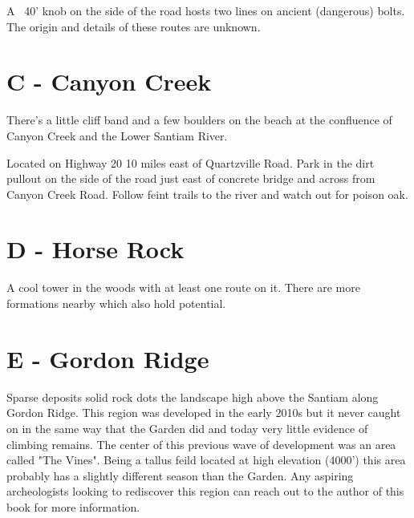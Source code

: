 \begin{multicols}{2}
A ~40' knob on the side of the road hosts two lines on ancient (dangerous) bolts. The origin and details of these routes are unknown.\\




\needspace{6em}

\section{C - Canyon Creek}\label{sa:Canyon Creek}

There's a little cliff band and a few boulders on the beach at the confluence of Canyon Creek and the Lower Santiam River.

Located on Highway 20 10 miles east of Quartzville Road. Park in the dirt pullout on the side of the road just east of concrete bridge and across from Canyon Creek Road. Follow feint trails to the river and watch out for poison oak.\\




\needspace{6em}

\section{D - Horse Rock}\label{sa:Horse Rock}

A cool tower in the woods with at least one route on it. There are more formations nearby which also hold potential.\\




\needspace{6em}

\section{E - Gordon Ridge}\label{sa:Gordon Ridge}

Sparse deposits solid rock dots the landscape high above the Santiam along Gordon Ridge. This region was developed in the early 2010s but it never caught on in the same way that the Garden did and today very little evidence of climbing remains. The center of this previous wave of development was an area called "The Vines". Being a tallus feild located at high elevation (4000') this area probably has a slightly different season than the Garden. Any aspiring archeologists looking to rediscover this region can reach out to the author of this book for more information.\\





\end{multicols}
